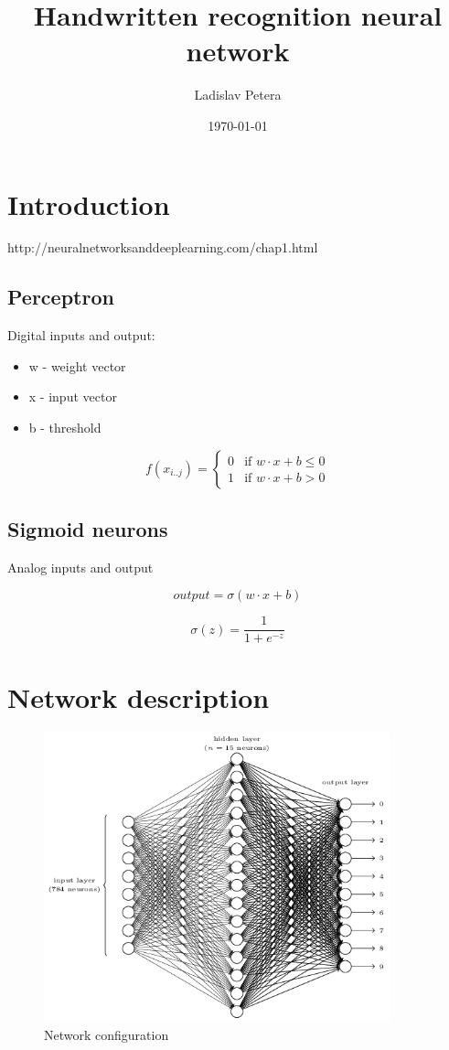 \documentclass[10pt,a4paper]{article}
\title{Handwritten recognition neural network}
\author{Ladislav Petera}
\date{\today}
\begin{document}
\maketitle

\section{Introduction}

http://neuralnetworksanddeeplearning.com/chap1.html


\subsection{Perceptron}

Digital inputs and output:
\begin{itemize}
\item w - weight vector
\item x - input vector
\item b - threshold
\end{itemize}

$$ 
f(x_{i..j}) = 
\begin{cases} 
  0 & \text{if } w \cdot  x + b \leq 0  \\
  1 & \text{if } w \cdot x + b  > 0
\end{cases}
$$

\subsection{Sigmoid neurons}

Analog inputs and output

$$
output = \sigma(w \cdot x + b)
$$

$$
\sigma(z) = \frac{1}{1 + e^{-z}}
$$



\section{Network description}

\begin{figure}[H]
\centering
\includegraphics[width=10cm]{network-configuration.png}
\caption{Network configuration}
\end{figure}
\end{document}
